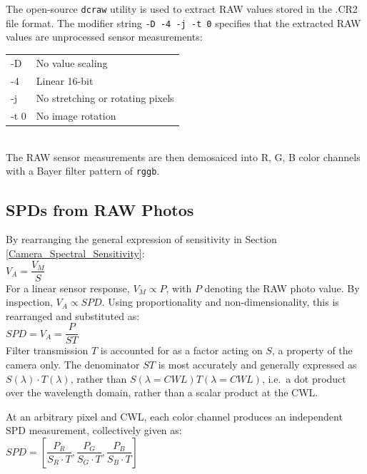 \documentclass[twocolumn,10pt]{asme2ej}
\newcommand{\id}{\hspace{6 mm}}
\begin{document}
\id The open-source \texttt{dcraw} utility is used to extract RAW values stored in the .CR2 file format. \cite{dcraw} The modifier string \texttt{-D -4 -j -t 0} specifies that the extracted RAW values are unprocessed sensor measurements:\\

\begin{tabular}{l | l}
-D & No value scaling \\
-4 & Linear 16-bit \\
-j & No stretching or rotating pixels \\
-t 0 & No image rotation \\
\end{tabular} \\

The RAW sensor measurements are then demosaiced into R, G, B color channels with a Bayer filter pattern of \texttt{rggb}.

\subsection{SPDs from RAW Photos}

 By rearranging the general expression of sensitivity in Section \ref{Camera_Spectral_Sensitivity}: \\

 $V_A = \dfrac{V_M}{S}$ \\

For a linear sensor response, $V_M \propto P$, with $P$ denoting the RAW photo value. By inspection, $V_A \propto SPD$. Using proportionality and non-dimensionality, this is rearranged and substituted as: \\

 $SPD = V_A = \dfrac{P}{ST}$ \\

Filter transmission $T$ is accounted for as a factor acting on $S$, a property of the camera only. The denominator $ST$ is most accurately and generally expressed as $S(\lambda) \cdot T(\lambda)$, rather than $S(\lambda=CWL) T(\lambda=CWL)$, i.e.\ a dot product over the wavelength domain, rather than a scalar product at the CWL.

\id At an arbitrary pixel and CWL, each color channel produces an independent SPD measurement, collectively given as: \\

 $SPD = \left[ \dfrac{P_R}{S_R \cdot T},\dfrac{P_G}{S_G \cdot T},\dfrac{P_B}{S_B \cdot T} \right] $ \\
\end{document}
